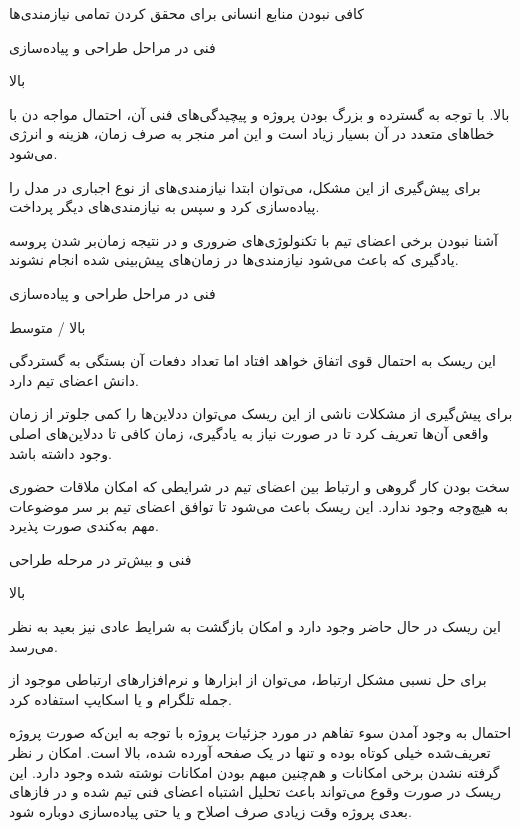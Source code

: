 
\noindent \hrulefill

 کافی نبودن منابع انسانی برای محقق کردن تمامی نیازمندی‌ها

 فنی در مراحل طراحی و پیاده‌سازی


 بالا

 بالا. با توجه به گسترده و بزرگ بودن پروژه و پیچیدگی‌های فنی آن، احتمال مواجه دن با خطاهای متعدد در آن بسیار زیاد است و این امر منجر به صرف زمان، هزینه و انرژی می‌شود.

 برای پیش‌گیری از این مشکل، می‌توان ابتدا نیازمندی‌های از نوع اجباری در مدل  را پیاده‌سازی کرد و سپس به نیازمندی‌های دیگر پرداخت.

\noindent \hrulefill

 آشنا نبودن برخی اعضای تیم با تکنولوژی‌های ضروری و در نتیجه زمان‌بر شدن پروسه یادگیری که باعث می‌شود نیازمندی‌ها در زمان‌های پیش‌بینی شده انجام نشوند.

 فنی در مراحل طراحی و پیاده‌سازی

 بالا / متوسط

 این ریسک به احتمال قوی اتفاق خواهد افتاد اما تعداد دفعات آن بستگی به گستردگی دانش اعضای تیم دارد.

 برای پیش‌گیری از مشکلات ناشی از این ریسک می‌توان ددلاین‌ها را کمی جلوتر از زمان واقعی آن‌ها تعریف کرد تا در صورت نیاز به یادگیری، زمان کافی تا ددلاین‌های اصلی وجود داشته باشد.

\noindent \hrulefill

 سخت بودن کار گروهی و ارتباط بین اعضای تیم در شرایطی که امکان ملاقات حضوری به هیچ‌وجه وجود ندارد. این ریسک باعث می‌شود تا توافق اعضای تیم بر سر موضوعات مهم به‌کندی صورت پذیرد.

 فنی و بیش‌تر در مرحله طراحی

 بالا

 این ریسک در حال حاضر وجود دارد و امکان بازگشت به شرایط عادی نیز بعید به نظر می‌رسد.

 برای حل نسبی مشکل ارتباط، می‌توان از ابزارها و نرم‌افزارهای ارتباطی موجود از جمله تلگرام و یا اسکایپ استفاده کرد.

\noindent \hrulefill


 احتمال به وجود آمدن سوء تفاهم در مورد جزئیات پروژه با توجه به این‌که صورت پروژه تعریف‌شده خیلی کوتاه بوده و تنها در یک صفحه آورده شده، بالا است. امکان ر نظر گرفته نشدن برخی امکانات و هم‌چنین مبهم بودن امکانات نوشته شده وجود دارد. این ریسک در صورت وقوع می‌تواند باعث تحلیل اشتباه اعضای فنی تیم شده و در فازهای بعدی پروژه وقت زیادی صرف اصلاح و یا حتی پیاده‌سازی دوباره شود.

